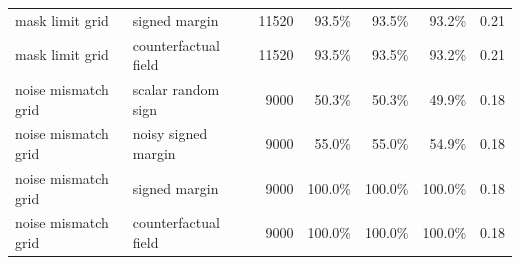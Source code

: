 \begin{tabular}{llrrrrr}
mask limit grid & signed margin & 11520 & 93.5\% & 93.5\% & 93.2\% & 0.21\\
mask limit grid & counterfactual field & 11520 & 93.5\% & 93.5\% & 93.2\% & 0.21\\
noise mismatch grid & scalar random sign & 9000 & 50.3\% & 50.3\% & 49.9\% & 0.18\\
noise mismatch grid & noisy signed margin & 9000 & 55.0\% & 55.0\% & 54.9\% & 0.18\\
noise mismatch grid & signed margin & 9000 & 100.0\% & 100.0\% & 100.0\% & 0.18\\
noise mismatch grid & counterfactual field & 9000 & 100.0\% & 100.0\% & 100.0\% & 0.18\\
\bottomrule\end{tabular}
